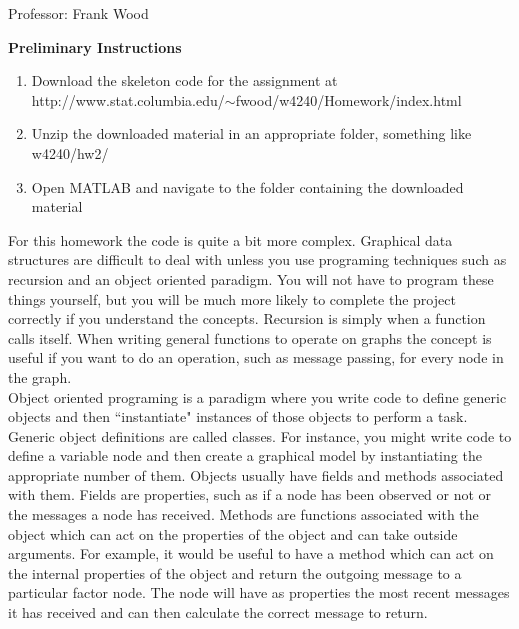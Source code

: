 \documentclass[12pt]{article}
\begin{document}

\begin{center}
	Professor: Frank Wood
\end{center}


{\bf Preliminary Instructions}

\begin{enumerate}
	\item Download the skeleton code for the assignment at \\  http://www.stat.columbia.edu/$\sim$fwood/w4240/Homework/index.html
	\item Unzip the downloaded material in an appropriate folder, something like w4240/hw2/
	\item Open MATLAB and navigate to the folder containing the downloaded material
\end{enumerate}

For this homework the code is quite a bit more complex.  Graphical data structures are difficult to deal with unless you use programing techniques such as recursion and an object oriented paradigm. You will not have to program these things yourself, but you will be much more likely to complete the project correctly if you understand the concepts.  Recursion is simply when a function calls itself.  When writing general functions to operate on graphs the concept is useful if you want to do an operation, such as message passing, for every node in the graph. \\

Object oriented programing is a paradigm where you write code to define generic objects and then ``instantiate" instances of those objects to perform a task.  Generic object definitions are called classes.  For instance, you might write code to define a variable node and then create a graphical model by instantiating the appropriate number of them.  Objects usually have fields and methods associated with them.  Fields are properties, such as if a node has been observed or not or the messages a node has received.  Methods are functions associated with the object which can act on the properties of the object and can take outside arguments.  For example, it would be useful to have a method which can act on the internal properties of the object and return the outgoing message to a particular factor node. The node will have as properties the most recent messages it has received and can then calculate the correct message to return. \\
\end{document}
